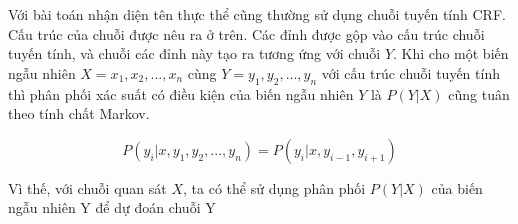 \documentclass[../main.tex]{subfiles}
\begin{document}
Với bài toán nhận diện tên thực thể cũng thường sử dụng chuỗi tuyến tính CRF. Cấu trúc của chuỗi được nêu ra ở trên. Các đỉnh được gộp vào cấu trúc chuỗi tuyến tính, và chuỗi các đỉnh này tạo ra tương ứng với chuỗi $Y$. Khi cho một biến ngẫu nhiên $X = x_{1}, x_{2}, ..., x_{n}$ cùng $Y = y_{1}, y_{2}, ..., y_{n}$ với cấu trúc chuỗi tuyến tính thì phân phối xác suất có điều kiện của biến ngẫu nhiên $Y$ là $P(Y|X)$ cũng tuân theo tính chất Markov. 

\begin{equation}
P(y_{i}|x, y_{1}, y_{2}, ..., y_{n}) = P(y_{i}|x, y_{i-1}, y_{i+1}) \nonumber
\end{equation}

Vì thế, với chuỗi quan sát $X$, ta có thể sử dụng phân phối $P(Y|X)$ của biến ngẫu nhiên Y để dự đoán chuỗi Y \cite{wallach2004conditional}
\end{document}
